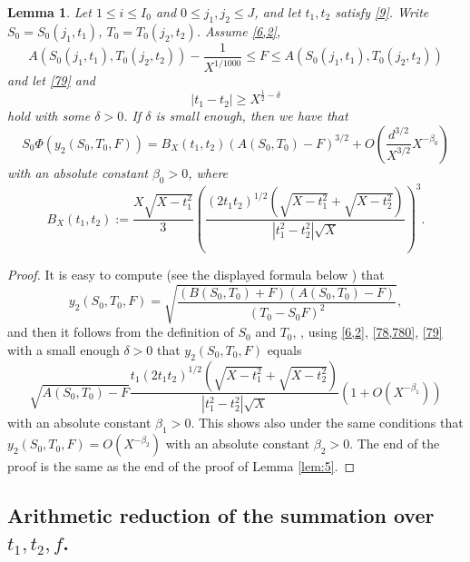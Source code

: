 \documentclass[12pt]{amsart}
\newtheorem{lemma}[theorem]{Lemma}
\theoremstyle{definition}
\numberwithin{equation}{section}
\begin{document}
\begin{lemma}\label{lem:6}Let $1\le i\le I_0$ and $0\le j_1,j_2\le
J$,
and let $t_1,t_2$ satisfy \eqref{9}. Write $S_0=S_0\left(j_1,t_1\right
)$,
$T_0=T_0\left(j_2,t_2\right)$. Assume \eqref{6,2},
\begin{equation}A\left(S_0\left(j_1,t_1\right),T_0\left(j_2,t_2\right
)\right)-\frac 1{X^{1/1000}}\le F\le A\left(S_0\left(j_1,t_1\right
),T_0\left(j_2,t_2\right)\right)\label{78,780}\end{equation}
and let \eqref{79} and
\begin{equation}\left|t_1-t_2\right|\ge X^{\frac 12-\delta}\label{79,15}\end{equation}
hold with some $\delta >0$. If $\delta$ is small enough, then we have that
\[S_0\Phi\left(y_2\left(S_0,T_0,F\right)\right)=B_X\left(t_1,t_2\right
)\left(A\left(S_0,T_0\right)-F\right)^{3/2}+O\left(\frac {d^{3/2}}{
X^{3/2}}X^{-\beta_0}\right)\]
with an absolute constant $\beta_0>0$, where
\begin{equation}B_X\left(t_1,t_2\right):=\frac {X\sqrt {X-t_1^2}}
3\left(\frac {\left(2t_1t_2\right)^{1/2}\left(\sqrt {X-t_1^2}+\sqrt {
X-t_2^2}\right)}{\left|t_1^2-t_2^2\right|\sqrt {X}}\right)^3.\label{79,2}\end{equation}
\end{lemma}
\begin{proof}It is easy to compute (see the displayed
formula below \cite[(6.53)]{Biro}) that
\[y_2\left(S_0,T_0,F\right)=\sqrt {\frac {\left(B\left(S_0,T_0\right
)+F\right)\left(A\left(S_0,T_0\right)-F\right)}{\left(T_0-S_0F\right
)^2}},\]
and then it follows from the definition of $S_0$ and $T_0$,
\cite[(6.30)]{Biro}, using \eqref{6,2}, \eqref{78,780},
\eqref{79} with a small enough $\delta >0$ that $y_2\left(S_0,T_0
,F\right)$ equals
\[\sqrt {A\left(S_0,T_0\right)-F}\frac {t_1\left(2t_1t_2\right)^{
1/2}\left(\sqrt {X-t_1^2}+\sqrt {X-t_2^2}\right)}{\left|t_1^2-t_2^
2\right|\sqrt {X}}\left(1+O\left(X^{-\beta_1}\right)\right)\]
with an absolute constant $\beta_1>0$. This shows also under the
same conditions that $y_2\left(S_0,T_0,F\right)=O\left(X^{-\beta_
2}\right)$ with an
absolute constant $\beta_2>0$. The end of the proof is the
same as the end of the proof of Lemma \ref{lem:5}.
\end{proof}




\subsection{Arithmetic reduction of the summation over $t_1,t_2,f$.}
\end{document}
